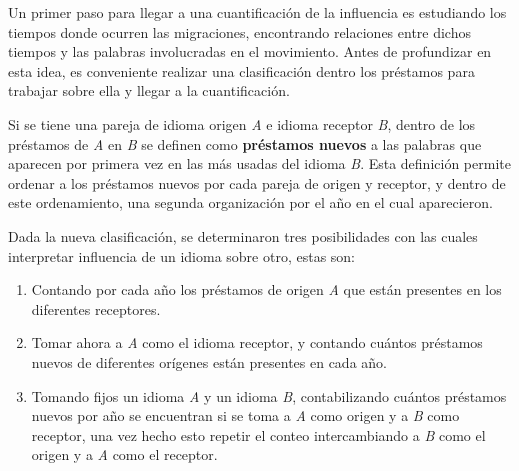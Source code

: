 
Un primer paso para llegar a una cuantificación de la influencia es estudiando
los tiempos donde ocurren las migraciones, encontrando relaciones entre dichos
tiempos y las palabras involucradas en el movimiento. Antes de profundizar en
esta idea, es conveniente realizar una clasificación dentro los préstamos para
trabajar sobre ella y llegar a la cuantificación. 

Si se tiene una pareja de idioma origen \textit{A} e idioma receptor
\textit{B},  dentro de los préstamos de \textit{A} en \textit{B} se definen
como  \textbf{préstamos nuevos} a las  palabras que aparecen por primera vez en
las más usadas del idioma \textit{B}. Esta definición permite ordenar a los
préstamos nuevos por cada pareja de origen y receptor, y dentro  de este
ordenamiento, una segunda organización  por el año en el cual aparecieron. 



Dada la nueva clasificación, se determinaron tres posibilidades con las cuales
interpretar influencia de un idioma sobre otro,  estas son: 

\begin{enumerate}
	\label{proceso.nuevos}
	
\item Contando por cada año los préstamos de origen \textit{A} que están presentes en los diferentes receptores. 

\item Tomar ahora a \textit{A}  como el idioma receptor, y contando cuántos préstamos nuevos de diferentes orígenes están presentes en cada año.  


\item Tomando fijos un idioma \textit{A} y un idioma \textit{B}, contabilizando cuántos préstamos nuevos por año se encuentran si se toma a \textit{A} como origen y a \textit{B} como receptor,  una vez hecho esto  repetir el conteo intercambiando a \textit{B} como el origen y a \textit{A} como el receptor. 

\end{enumerate}


